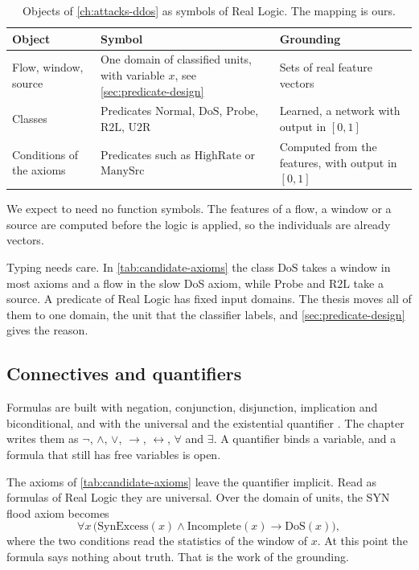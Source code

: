 \begin{table}[htbp]
\centering
\footnotesize
\setlength{\tabcolsep}{3pt}
\caption{Objects of \cref{ch:attacks-ddos} as symbols of Real Logic. The
mapping is ours.}
\label{tab:rl-symbols}
\begin{tabular}{@{}p{2.6cm}p{4.9cm}p{4.8cm}@{}}
\toprule
Object & Symbol & Grounding \\
\midrule
Flow, window, source
  & One domain of classified units, with variable $x$, see \cref{sec:predicate-design}
  & Sets of real feature vectors \\
Classes
  & Predicates $\mathrm{Normal}$, $\mathrm{DoS}$, $\mathrm{Probe}$, $\mathrm{R2L}$, $\mathrm{U2R}$
  & Learned, a network with output in $[0,1]$ \\
Conditions of the axioms
  & Predicates such as $\mathrm{HighRate}$ or $\mathrm{ManySrc}$
  & Computed from the features, with output in $[0,1]$ \\
\bottomrule
\end{tabular}
\end{table}

We expect to need no function symbols. The features of a flow, a window or a
source are computed before the logic is applied, so the individuals are
already vectors.

Typing needs care. In \cref{tab:candidate-axioms} the class $\mathrm{DoS}$
takes a window in most axioms and a flow in the slow DoS axiom, while
$\mathrm{Probe}$ and $\mathrm{R2L}$ take a source. A predicate of Real Logic
has fixed input domains. The thesis moves all of them to one domain, the unit
that the classifier labels, and \cref{sec:predicate-design} gives the reason.

\subsection{Connectives and quantifiers}
\label{sec:rl-connectives}

Formulas are built with negation, conjunction, disjunction, implication and
biconditional, and with the universal and the existential quantifier
\citep{badreddine2022ltn}. The chapter writes them as $\neg$, $\wedge$,
$\vee$, $\rightarrow$, $\leftrightarrow$, $\forall$ and $\exists$. A
quantifier binds a variable, and a formula that still has free variables is
open.

The axioms of \cref{tab:candidate-axioms} leave the quantifier implicit. Read
as formulas of Real Logic they are universal. Over the domain of units, the
SYN flood axiom becomes
\[
\forall x\,\bigl(\mathrm{SynExcess}(x)\wedge\mathrm{Incomplete}(x)\rightarrow
\mathrm{DoS}(x)\bigr),
\]
where the two conditions read the statistics of the window of $x$.
At this point the formula says nothing about truth. That is the work of the
grounding.

